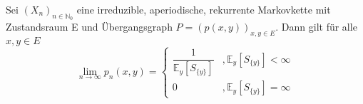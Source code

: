 Sei $(X_{n})_{n \in \mathbb{N}_{0}}$ eine irreduzible, aperiodische, rekurrente Markovkette mit Zustandsraum E und Übergangsgraph $P = (p(x,y))_{x,y \in E}$. Dann gilt für alle $x,y \in E$
\begin{equation*}
\lim_{n \to \infty} p_{n}(x,y) =
\begin{cases}
\dfrac{1}{\mathbb{E}_{y}[S_{\lbrace y \rbrace}]} & , \mathbb{E}_{y}[S_{\lbrace y \rbrace}] < \infty\\
0 & , \mathbb{E}_{y}[S_{\lbrace y \rbrace}] = \infty 
\end{cases}
\end{equation*}